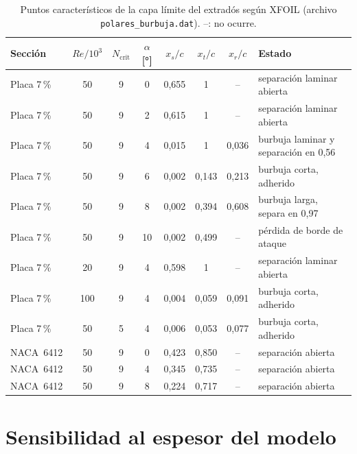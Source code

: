 \begin{table}[H]
\centering\small
\caption[Puntos característicos de la capa límite del extradós según XFOIL]{Puntos característicos de la capa límite del extradós según XFOIL
(archivo \texttt{polares\_burbuja.dat}). --: no ocurre.}
\label{tab:polares-bur}
\begin{tabular}{@{}lccccccl@{}}
\toprule
\textbf{Sección} & $Re/10^3$ & $N_{\text{crit}}$ & $\alpha$ [\si{\degree}] & $x_s/c$ & $x_t/c$ & $x_r/c$ & \textbf{Estado}\\\midrule
Placa 7\,\% & 50 & 9 & 0  & 0,655 & 1     & --    & separación laminar abierta\\
Placa 7\,\% & 50 & 9 & 2  & 0,615 & 1     & --    & separación laminar abierta\\
Placa 7\,\% & 50 & 9 & 4  & 0,015 & 1     & 0,036 & burbuja laminar y separación en 0,56\\
Placa 7\,\% & 50 & 9 & 6  & 0,002 & 0,143 & 0,213 & burbuja corta, adherido\\
Placa 7\,\% & 50 & 9 & 8  & 0,002 & 0,394 & 0,608 & burbuja larga, separa en 0,97\\
Placa 7\,\% & 50 & 9 & 10 & 0,002 & 0,499 & --    & pérdida de borde de ataque\\
Placa 7\,\% & 20 & 9 & 4  & 0,598 & 1     & --    & separación laminar abierta\\
Placa 7\,\% & 100 & 9 & 4 & 0,004 & 0,059 & 0,091 & burbuja corta, adherido\\
Placa 7\,\% & 50 & 5 & 4  & 0,006 & 0,053 & 0,077 & burbuja corta, adherido\\
NACA~6412   & 50 & 9 & 0  & 0,423 & 0,850 & --    & separación abierta\\
NACA~6412   & 50 & 9 & 4  & 0,345 & 0,735 & --    & separación abierta\\
NACA~6412   & 50 & 9 & 8  & 0,224 & 0,717 & --    & separación abierta\\
\bottomrule
\end{tabular}
\end{table}

\section{Sensibilidad al espesor del modelo}\label{sec:polares-espesor}

